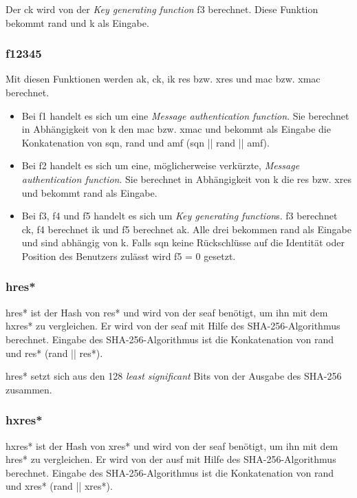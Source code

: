 Der \gls{ck} wird von der \textit{Key generating function} f3 berechnet.
Diese Funktion bekommt \gls{rand} und \gls{k} als Eingabe. %

\subsubsection{\gls{f12345}}
Mit diesen Funktionen werden \gls{ak}, \gls{ck}, \gls{ik} \gls{res} bzw. \gls{xres} und \gls{mac} bzw. \gls{xmac} berechnet. %
\begin{itemize}
\item Bei f1 handelt es sich um eine \textit{Message authentication function}.
Sie berechnet in Abhängigkeit von \gls{k} den \gls{mac} bzw. \gls{xmac} und bekommt als Eingabe die Konkatenation von \gls{sqn}, \gls{rand} und \gls{amf} (\gls{sqn} || \gls{rand} || \gls{amf}). \\
\item Bei f2 handelt es sich um eine, möglicherweise verkürzte, \textit{Message authentication function}.
Sie berechnet in Abhängigkeit von \gls{k} die \gls{res} bzw. \gls{xres} und bekommt \gls{rand} als Eingabe.
\item Bei f3, f4 und f5 handelt es sich um \textit{Key generating function}s.
f3 berechnet \gls{ck}, f4 berechnet \gls{ik} und f5 berechnet \gls{ak}.
Alle drei bekommen \gls{rand} als Eingabe und sind abhängig von \gls{k}.
Falls \gls{sqn} keine Rückschlüsse auf die Identität oder Position des Benutzers zulässt wird f5 = 0 gesetzt.
\end{itemize}

\subsubsection{\gls{hres*}}
\gls{hres*} ist der Hash von \gls{res*} und wird von der \gls{seaf} benötigt, um ihn mit dem \gls{hxres*} zu vergleichen.
Er wird von der \gls{seaf} mit Hilfe des SHA-256-Algorithmus berechnet. %
Eingabe des SHA-256-Algorithmus ist die Konkatenation von \gls{rand} und \gls{res*} (\gls{rand} || \gls{res*}).

\gls{hres*} setzt sich aus den 128 \textit{least significant} Bits von der Ausgabe des SHA-256 zusammen.

\subsubsection{\gls{hxres*}}
\gls{hxres*} ist der Hash von \gls{xres*} und wird von der \gls{seaf} benötigt, um ihn mit dem \gls{hres*} zu vergleichen.
Er wird von der \gls{ausf} mit Hilfe des SHA-256-Algorithmus berechnet. %
Eingabe des SHA-256-Algorithmus ist die Konkatenation von \gls{rand} und \gls{xres*} (\gls{rand} || \gls{xres*}).

